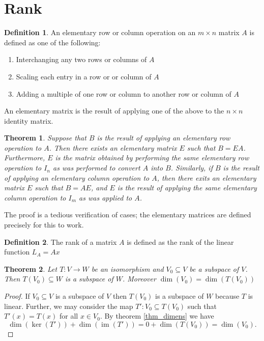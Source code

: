 \documentclass[oneside, 12pt]{book}
\DeclareMathOperator{\im}{im}
\newtheorem{thm}{Theorem}[section]
\theoremstyle{definition}
\newtheorem{defn}{Definition}[section]
\begin{document}
\section{Rank}
\begin{defn}
\label{defn_elmop}
  An elementary row or column operation on an $m \times n$ matrix $A$ is defined as one of the following:
  \begin{enumerate}
    \item Interchanging any two rows or columns of $A$
    \item Scaling each entry in a row or or column of $A$
    \item Adding a multiple of one row or column to another row or column of $A$
  \end{enumerate}
  An elementary matrix is the result of applying one of the above to the $n \times n$ identity matrix.
\end{defn}
\begin{thm}
\label{thm_elmop}
  Suppose that $B$ is the result of applying an elementary row operation to $A$. Then there exists an elementary matrix $E$ such that $B=EA$. Furthermore, $E$ is the matrix obtained by performing the same elementary row operation to $I_{n}$ as was performed to convert $A$ into $B$. Similarly, if $B$ is the result of applying
  an elementary column operation to $A$, then there exits an elementary matrix $E$ such that $B=AE$, and $E$ is the result of applying the same elementary column operation to $I_{m}$ as was applied to $A$.
\end{thm}
The proof is a tedious verification of cases; the elementary matrices are defined precisely for this to work.
\begin{defn}
\label{defn_rnk}
The rank of a matrix $A$ is defined as the rank of the linear function $L_{A}=Ax$
\end{defn}
\begin{thm}
  \label{thm_subiso}
Let $T: V \to W$ be an isomorphism and $V_{0} \subseteq V$ be a subspace of $V$. Then $T(V_{0})\subseteq W$ is a subspace of $W$. Moreover $\dim(V_{0})=\dim(T(V_{0}))$
\end{thm}
\begin{proof}
  If $V_{0}\subseteq V$ is a subspace of $V$ then $T(V_{0})$ is a subspace of $W$ because $T$ is linear. Further, we may consider the map $T':V_{0} \subseteq T(V_{0})$ such that $T'(x)=T(x)$ for all $x \in V_{0}$. By theorem \ref{thm_dimens} we have \[\dim(\ker(T'))+\dim(\im(T'))=0+ \dim(T(V_{0}))=\dim(V_{0}).\]
\end{proof}
\end{document}
